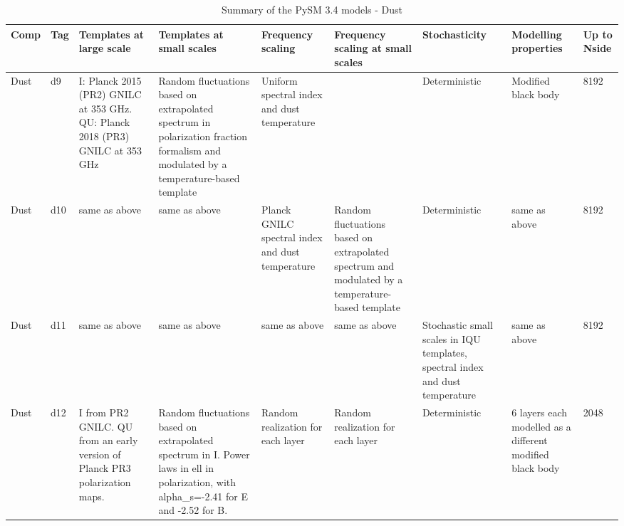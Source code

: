 \documentclass[twocolumn]{aastex631}
\begin{document}
\begin{table}[t]
\caption{Summary of the PySM 3.4 models - Dust}
\begin{center}
\begin{tabular}{ | m{1cm} | m{0.5cm}| m{2cm} | m{2.2cm} | m{2cm}| m{2.2cm} | m{2cm} | m{2cm}| m{.7cm} | } 

  \toprule
Comp & Tag & Templates at large scale & Templates at small scales & Frequency scaling & Frequency scaling at small scales & Stochasticity & Modelling properties & Up to Nside \\
\midrule
Dust & d9 & I: Planck 2015 (PR2) GNILC at 353 GHz. QU: Planck 2018 (PR3) GNILC at 353 GHz & Random fluctuations based on extrapolated spectrum in polarization fraction formalism and modulated by a temperature-based template & Uniform spectral index and dust temperature &  & Deterministic & Modified black body & 8192 \\
\hline
Dust & d10 & same as above & same as above & Planck GNILC spectral index and dust temperature & Random fluctuations based on extrapolated spectrum and modulated by a temperature-based template & Deterministic & same as above & 8192 \\
\hline

Dust & d11 & same as above & same as above & same as above & same as above & Stochastic small scales in IQU templates, spectral index and dust temperature & same as above & 8192 \\
\hline

Dust & d12 & I from PR2 GNILC. QU from an early version of Planck PR3 polarization maps. & Random fluctuations based on extrapolated spectrum in I. Power laws in ell in polarization, with alpha\_s=-2.41 for E and -2.52 for B. & Random realization for each layer & Random realization for each layer & Deterministic & 6 layers each modelled as a different modified black body & 2048 \\
\bottomrule
\end{tabular}
\end{center}
\label{table:summarydust}
\end{table}
\end{document}
